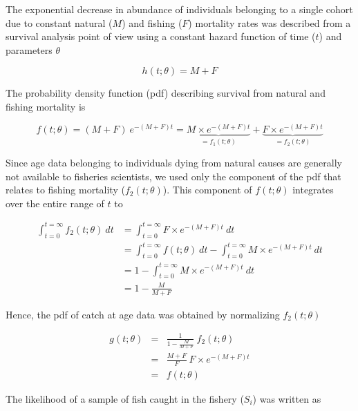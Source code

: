 The exponential decrease in abundance of individuals belonging to a single cohort due to constant natural ($M$) and fishing ($F$) mortality rates was described from a survival analysis point of view \citep{scimar42,cox84b} using a constant hazard function of time ($t$) and parameters $\theta$

\begin{equation}
h(t; \theta) = M + F
\end{equation}

The probability density function (pdf) describing survival from natural and fishing mortality is

\begin{equation}
f(t; \theta) = (M + F) \ e^{-(M+F)t} = \underbrace{M \times e^{-(M+F)t}}_{=f_{1}(t; \theta)} + \underbrace{F \times e^{-(M+F)t}}_{=f_{2}(t; \theta)}
\end{equation}

Since age data belonging to individuals dying from natural causes are generally not available to fisheries scientists, we used only the component of the pdf that relates to fishing mortality ($f_{2}(t; \theta)$). This component of $f(t; \theta)$ integrates over the entire range of $t$ to 

\begin{align}
 \int_{t=0}^{t=\infty} f_{2}(t; \theta) \ dt &= \int_{t=0}^{t=\infty} F \times e^{-(M+F)t} \ dt\\
                                         &= \int_{t=0}^{t=\infty} f(t; \theta) \ dt - \int_{t=0}^{t=\infty} M \times e^{-(M+F)t} \ dt\\
                                         &= 1 - \int_{t=0}^{t=\infty} M \times e^{-(M+F)t} \ dt \\
                                         &= 1 - \frac{M}{M+F}
\end{align}

Hence, the pdf of catch at age data was obtained by normalizing $f_{2}(t; \theta)$

\begin{eqnarray}
g(t; \theta) &=& \frac{1}{1 - \frac{M}{M+F}} \ f_{2}(t; \theta) \\
             &=& \frac{M+F}{F} \ F \times e^{-(M+F)t} \\
             &=& f(t; \theta)
\end{eqnarray} 

The likelihood \citep{edwards1992likelihood} of a sample of fish caught in the fishery ($S_{i}$) was written as 

